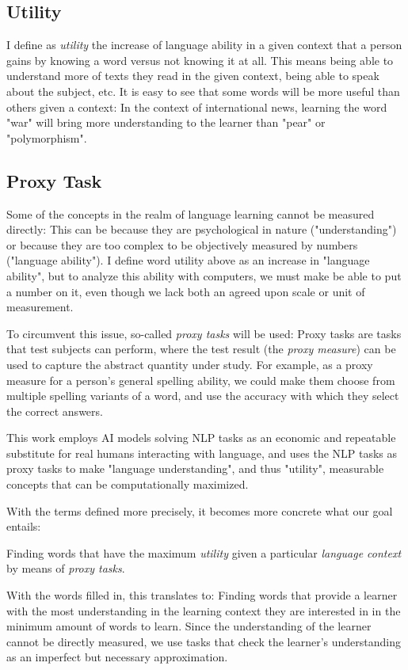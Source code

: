\subsection{Utility}
I define as \textit{utility} the increase of language ability in a given context that a person gains by knowing a word versus not knowing it at all.
This means being able to understand more of texts they read in the given context, being able to speak about the subject, etc.
It is easy to see that some words will be more useful than others given a context:
In the context of international news, learning the word "war" will bring more understanding to the learner than "pear" or "polymorphism".

\subsection{Proxy Task}
Some of the concepts in the realm of language learning cannot be measured directly:
This can be because they are psychological in nature ("understanding") or because they are too complex to be objectively measured by numbers ("language ability").
I define word utility above as an increase in "language ability", but to analyze this ability with computers, we must make be able to put a number on it, even though we lack both an agreed upon scale or unit of measurement.

To circumvent this issue, so-called \textit{proxy tasks} will be used:
Proxy tasks are tasks that test subjects can perform, where the test result (the \textit{proxy measure}) can be used to capture the abstract quantity under study.
For example, as a proxy measure for a person's general spelling ability, we could make them choose from multiple spelling variants of a word, and use the accuracy with which they select the correct answers.

This work employs AI models solving NLP tasks as an economic and repeatable substitute for real humans interacting with language, and uses the NLP tasks as proxy tasks to make "language understanding", and thus "utility", measurable concepts that can be computationally maximized.

With the terms defined more precisely, it becomes more concrete what our goal entails:

Finding words that have the maximum \textit{utility} given a particular \textit{language context} by means of \textit{proxy tasks}.

With the words filled in, this translates to:
Finding words that provide a learner with the most understanding in the learning context they are interested in in the minimum amount of words to learn.
Since the understanding of the learner cannot be directly measured, we use tasks that check the learner's understanding as an imperfect but necessary approximation.



